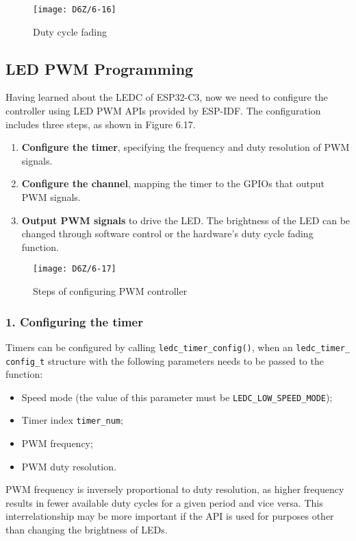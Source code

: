 \documentclass[a4paper,12pt]{book}
\begin{document}
\begin{figure}[h!]
    \centering
    \texttt{[image: D6Z/6-16]}
    \caption{Duty cycle fading}
\end{figure}

\subsection{LED PWM Programming}
Having learned about the LEDC of ESP32-C3, now we need to configure the controller using LED PWM APIs provided by ESP-IDF. The configuration includes three steps, as shown in Figure 6.17.

\begin{enumerate}[label=\arabic*.,noitemsep]
    \item \textbf{Configure the timer}, specifying the frequency and duty resolution of PWM signals.
    \item \textbf{Configure the channel}, mapping the timer to the GPIOs that output PWM signals.
    \item \textbf{Output PWM signals} to drive the LED. The brightness of the LED can be changed through software control or the hardware’s duty cycle fading function.
\end{enumerate}

\begin{figure}[h!]
    \centering
    \texttt{[image: D6Z/6-17]}
    \caption{Steps of configuring PWM controller}
\end{figure}

\subsubsection{1. Configuring the timer}
Timers can be configured by calling \verb|ledc_timer_config()|, when an \verb|ledc_timer_|\\ \verb|config_t| structure with the following parameters needs to be passed to the function:

\begin{itemize}[noitemsep]
    \item Speed mode (the value of this parameter must be \verb|LEDC_LOW_SPEED_MODE|);
    \item Timer index \verb|timer_num|;
    \item PWM frequency;
    \item PWM duty resolution.
\end{itemize}

PWM frequency is inversely proportional to duty resolution, as higher frequency results in fewer available duty cycles for a given period and vice versa. This interrelationship may be more important if the API is used for purposes other than changing the brightness of LEDs.
\end{document}
